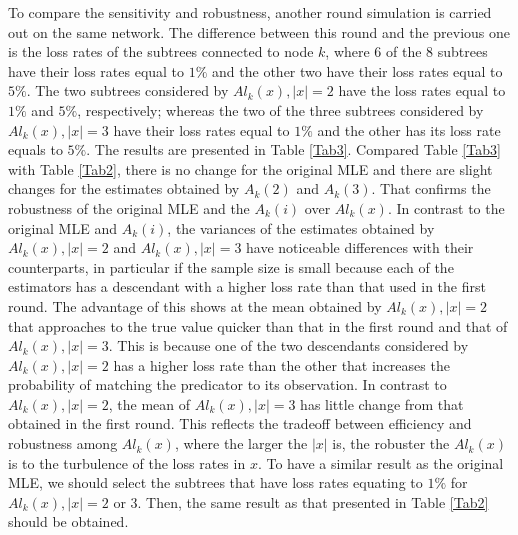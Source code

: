 \documentclass[10pt,onecolumn]{IEEEtran}
\begin{document}
To compare the sensitivity and robustness, another round simulation is carried out on the same network.
 The difference between this round and the previous one is the loss rates of the subtrees connected to node $k$, where 6 of the 8 subtrees have their loss rates equal to $1\%$ and the other two have their loss rates equal to $5\%$. The two subtrees
  considered by $Al_k(x), |x|=2$ have the loss rates equal to $1\%$ and $5\%$, respectively; whereas the two of the three subtrees considered by $Al_k(x), |x|=3$ have their loss rates equal to $1\%$ and the other has its loss rate equals to $5\%$. The results are presented in Table \ref{Tab3}. Compared Table \ref{Tab3} with Table \ref{Tab2}, there is no change for the original MLE and there are slight changes for the estimates obtained by $A_k(2)$ and $A_k(3)$. That confirms the robustness of the original MLE and the $A_k(i)$ over $Al_k(x)$. In contrast to the original MLE and $A_k(i)$, the variances of the estimates obtained by $Al_k(x), |x|=2$ and  $Al_k(x), |x|=3$ have noticeable differences with their counterparts, in particular  if the sample size is small because each of the estimators has a descendant with a higher loss rate than that used in the first round.  The advantage of this shows at the mean obtained by $Al_k(x), |x|=2$ that
 approaches to the true value quicker than that in the first round and that of $Al_k(x), |x|=3$.  This is because one of the two descendants considered by $Al_k(x), |x|=2$ has a higher loss rate than the other that increases the probability of  matching the predicator to its observation. In contrast to $Al_k(x), |x|=2$, the mean of $Al_k(x), |x|=3$ has little change from that obtained in the first round. This reflects the tradeoff between efficiency and robustness among $Al_k(x)$, where the larger the $|x|$ is, the robuster the $Al_k(x)$ is to the turbulence of the loss rates in $x$. 
 To have a similar result as the original MLE, we should select  the subtrees that have loss rates equating to $1\%$ for $Al_k(x), |x| = 2$ or $3$. Then, the same result as that presented in Table \ref{Tab2} should be obtained.
\end{document}
